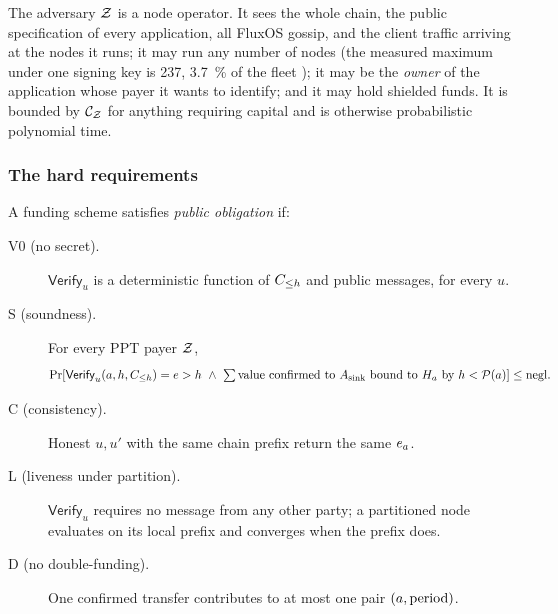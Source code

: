 \begin{assumption}
\label{ass:pp-adversary}
The adversary $\mathcal{Z}$ is a node operator. It sees the whole chain, the public specification of every
application, all FluxOS gossip, and the client traffic arriving at the nodes it runs; it may run any
number of nodes (the measured maximum under one signing key is \num{237}, \qty{3.7}{\percent} of the
fleet ); it may be the \emph{owner} of
the application whose payer it wants to identify; and it may hold shielded funds. It is bounded by
$\mathcal{C}_{\mathcal{Z}}$ for anything requiring capital and is otherwise probabilistic polynomial time.
\end{assumption}

\subsubsection{The hard requirements}

\begin{definition}
\label{def:pp-obligation}
A funding scheme satisfies \emph{public obligation} if:
\begin{description}
  \item[V0 (no secret).] $\mathsf{Verify}_u$ is a deterministic function of $C_{\le h}$ and public
    messages, for every $u$.
  \item[S (soundness).] For every PPT payer $\mathcal{Z}$,
    \[
      \Pr\!\left[\mathsf{Verify}_u(a,h,C_{\le h}) = e > h
      \ \wedge\ \textstyle\sum \text{value confirmed to } A_{\mathrm{sink}} \text{ bound to } H_{a} \text{ by } h < \mathcal{P}(a)\right]
      \le \mathrm{negl}.
    \]
  \item[C (consistency).] Honest $u, u'$ with the same chain prefix return the same $e_{a}$.
  \item[L (liveness under partition).] $\mathsf{Verify}_u$ requires no message from any other party; a
    partitioned node evaluates on its local prefix and converges when the prefix does.
  \item[D (no double-funding).] One confirmed transfer contributes to at most one pair
    $(a,\text{period})$.
\end{description}
\end{definition}

